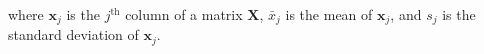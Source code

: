 \noindent where
$
\mathbf{x}_{j}
$
is the
$
j^{\mathrm{th}}
$
column of a matrix
$
\mathbf{X}
$,
$
\bar{x}_{j}
$
is the mean of
$
\mathbf{x}_{j}
$,
and
$
s_{j}
$
is the standard deviation of
$
\mathbf{x}_{j}
$.
